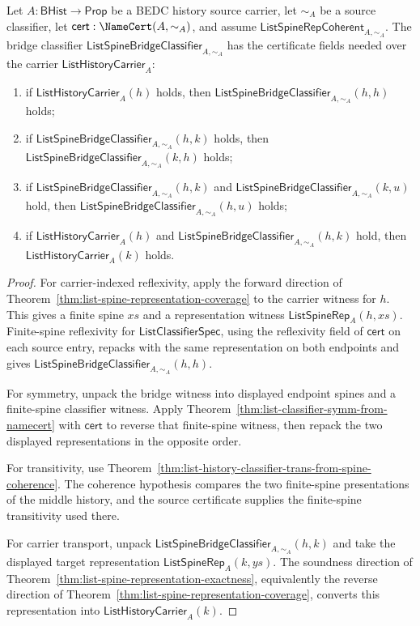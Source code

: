 \begin{theorem}
\label{thm:list-spine-bridge-certificate-fields}
Let $A:\mathsf{BHist}\to\mathsf{Prop}$ be a BEDC history source carrier, let
$\sim_A$ be a source classifier, let $\mathsf{cert}:\NameCert(A,\sim_A)$, and
assume $\mathsf{ListSpineRepCoherent}_{A,\sim_A}$. The bridge classifier
$\mathsf{ListSpineBridgeClassifier}_{A,\sim_A}$ has the certificate fields
needed over the carrier $\mathsf{ListHistoryCarrier}_A$:
\begin{enumerate}
  \item if $\mathsf{ListHistoryCarrier}_A(h)$ holds, then $\mathsf{ListSpineBridgeClassifier}_{A,\sim_A}(h,h)$ holds;
  \item if $\mathsf{ListSpineBridgeClassifier}_{A,\sim_A}(h,k)$ holds, then $\mathsf{ListSpineBridgeClassifier}_{A,\sim_A}(k,h)$ holds;
  \item if $\mathsf{ListSpineBridgeClassifier}_{A,\sim_A}(h,k)$ and $\mathsf{ListSpineBridgeClassifier}_{A,\sim_A}(k,u)$ hold, then $\mathsf{ListSpineBridgeClassifier}_{A,\sim_A}(h,u)$ holds;
  \item if $\mathsf{ListHistoryCarrier}_A(h)$ and $\mathsf{ListSpineBridgeClassifier}_{A,\sim_A}(h,k)$ hold, then $\mathsf{ListHistoryCarrier}_A(k)$ holds.
\end{enumerate}
\end{theorem}
\begin{proof}
For carrier-indexed reflexivity, apply the forward direction of
Theorem~\ref{thm:list-spine-representation-coverage} to the carrier witness for
$h$. This gives a finite spine $xs$ and a representation witness
$\mathsf{ListSpineRep}_A(h,xs)$. Finite-spine reflexivity for
$\mathsf{ListClassifierSpec}$, using the reflexivity field of $\mathsf{cert}$ on
each source entry, repacks with the same representation on both endpoints and
gives $\mathsf{ListSpineBridgeClassifier}_{A,\sim_A}(h,h)$.

For symmetry, unpack the bridge witness into displayed endpoint spines and a
finite-spine classifier witness. Apply
Theorem~\ref{thm:list-classifier-symm-from-namecert} with $\mathsf{cert}$ to
reverse that finite-spine witness, then repack the two displayed representations
in the opposite order.

For transitivity, use
Theorem~\ref{thm:list-history-classifier-trans-from-spine-coherence}. The
coherence hypothesis compares the two finite-spine presentations of the middle
history, and the source certificate supplies the finite-spine transitivity used
there.

For carrier transport, unpack
$\mathsf{ListSpineBridgeClassifier}_{A,\sim_A}(h,k)$ and take the displayed
target representation $\mathsf{ListSpineRep}_A(k,ys)$. The soundness direction of
Theorem~\ref{thm:list-spine-representation-exactness}, equivalently the reverse
direction of Theorem~\ref{thm:list-spine-representation-coverage}, converts this
representation into $\mathsf{ListHistoryCarrier}_A(k)$.
\end{proof}

